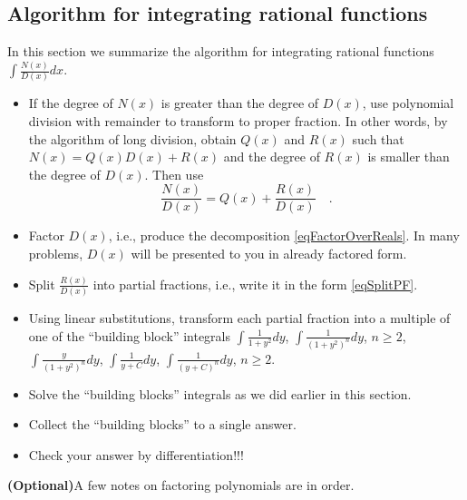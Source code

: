 \documentclass[12pt]{book}
\newcommand{\optionalMaterial}{\textbf{(Optional)}}
\begin{document}
\subsection{Algorithm for integrating rational functions}
In this section we summarize the algorithm for integrating rational functions $\int \frac{N(x)}{D(x)}dx$.
\begin{itemize}
\item If the degree of $N(x)$ is greater than the degree of $D(x)$, use polynomial division with remainder to transform to proper fraction. In other words, by the algorithm of long division, obtain $Q(x)$ and $R(x)$ such that $N(x)= Q(x)D(x)+R(x)$ and the degree of $R(x)$ is smaller than the degree of $D(x)$. Then use 
\[
\frac{N(x)}{D(x)}=Q(x) +\frac{R(x)}{D(x)}\quad .
\]
\item Factor $D(x)$, i.e., produce the decomposition \eqref{eqFactorOverReals}. In many problems, $D(x)$ will be presented to you in already factored form.
\item Split $\frac{R(x)}{D(x)}$ into partial fractions, i.e., write it in the form \eqref{eqSplitPF}. 
\item Using linear substitutions, transform each partial fraction into a multiple of one of the ``building block'' integrals  $\int \frac{1}{1+y^2}dy$, $\int \frac{1}{(1+y^2)^n}dy$, $n\geq 2$, $\int \frac{y}{(1+y^2)^n}dy$, $\int \frac{1}{y+C}dy$, $\int \frac{1}{(y+C)^n}dy$, $n\geq 2$.
\item Solve the ``building blocks'' integrals as we did earlier in this section.
\item Collect the ``building blocks'' to a single answer.
\item Check your answer by differentiation!!!
\end{itemize}
\optionalMaterial A few notes on factoring polynomials are in order. 
\end{document}
